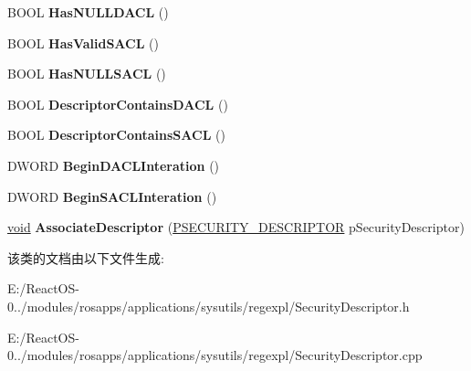 \begin{DoxyCompactItemize}
B\+O\+OL {\bfseries Has\+N\+U\+L\+L\+D\+A\+CL} ()
\item 
\mbox{\label{class_c_security_descriptor_a0c0111ede473f2706bf764af612fc388}} 
B\+O\+OL {\bfseries Has\+Valid\+S\+A\+CL} ()
\item 
\mbox{\label{class_c_security_descriptor_a53d37b2510abae5716e78e7fed52f6f0}} 
B\+O\+OL {\bfseries Has\+N\+U\+L\+L\+S\+A\+CL} ()
\item 
\mbox{\label{class_c_security_descriptor_a53672b7cc6d15da5db2c9b621dede91e}} 
B\+O\+OL {\bfseries Descriptor\+Contains\+D\+A\+CL} ()
\item 
\mbox{\label{class_c_security_descriptor_a82f8493cca5d32b3c1c04b640c5c6e33}} 
B\+O\+OL {\bfseries Descriptor\+Contains\+S\+A\+CL} ()
\item 
\mbox{\label{class_c_security_descriptor_ab5aeb6ae172cc7aaad377728c9e36a95}} 
D\+W\+O\+RD {\bfseries Begin\+D\+A\+C\+L\+Interation} ()
\item 
\mbox{\label{class_c_security_descriptor_a5759c9b8bab4d4cc0586710ba20de9ab}} 
D\+W\+O\+RD {\bfseries Begin\+S\+A\+C\+L\+Interation} ()
\item 
\mbox{\label{class_c_security_descriptor_a0e9383b2fd592c0cc3de8ef67a89085d}} 
\hyperlink{interfacevoid}{void} {\bfseries Associate\+Descriptor} (\hyperlink{struct___s_e_c_u_r_i_t_y___d_e_s_c_r_i_p_t_o_r}{P\+S\+E\+C\+U\+R\+I\+T\+Y\+\_\+\+D\+E\+S\+C\+R\+I\+P\+T\+OR} p\+Security\+Descriptor)
\end{DoxyCompactItemize}


该类的文档由以下文件生成\+:\begin{DoxyCompactItemize}
\item 
E\+:/\+React\+O\+S-\/0../modules/rosapps/applications/sysutils/regexpl/Security\+Descriptor.\+h\item 
E\+:/\+React\+O\+S-\/0../modules/rosapps/applications/sysutils/regexpl/Security\+Descriptor.\+cpp\end{DoxyCompactItemize}
